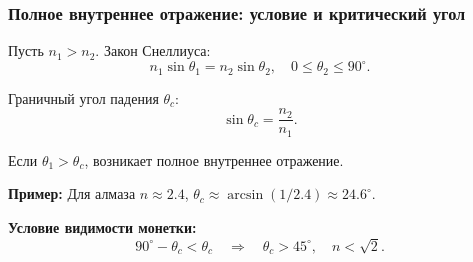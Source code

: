 \documentclass[12pt, a4paper]{article}
\begin{document}
\subsubsection*{Полное внутреннее отражение: условие и критический угол}
Пусть \(n_1 > n_2\). Закон Снеллиуса:
\[
n_1 \sin \theta_1 = n_2 \sin \theta_2, \quad 0 \le \theta_2 \le 90^\circ.
\]

Граничный угол падения \(\theta_c\):
\[
\sin \theta_c = \frac{n_2}{n_1}.
\]

Если \(\theta_1 > \theta_c\), возникает полное внутреннее отражение.

\textbf{Пример:} Для алмаза \(n \approx 2.4\), \(\theta_c \approx \arcsin(1/2.4) \approx 24.6^\circ\).

\textbf{Условие видимости монетки:}
\[
90^\circ - \theta_c < \theta_c \quad \Longrightarrow \quad \theta_c > 45^\circ, \quad n < \sqrt{2}.
\]
\end{document}
